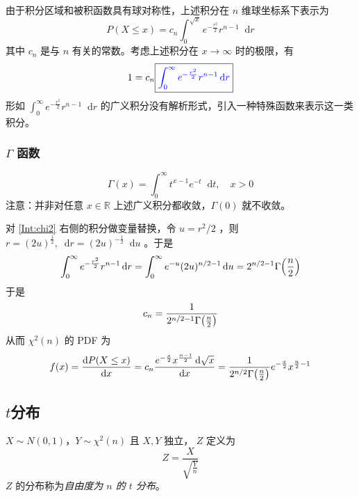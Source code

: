\documentclass[12pt,uft8]{ctexrep}
\newcommand{\dif}{\mathop{}\!\mathrm{d}}
\begin{document}
由于积分区域和被积函数具有球对称性，上述积分在 $n$ 维球坐标系下表示为 
$$ P(X \le x)  = c_n \int_{0}^{\sqrt{x}} e^{-\frac{r^2}{2}}  r^{n-1}\dif r $$
其中 $c_n$ 是与 $n$ 有关的常数。考虑上述积分在 $x\to \infty$ 时的极限，有
\begin{equation}
    1 = c_n \boxed{\color{blue}{\int_{0}^{\infty} e^{-\frac{r^2}{2}}  r^{n-1}\dif r}} \label{Int:chi2}
\end{equation}
形如 $ \int_{0}^{\infty} e^{-\frac{r^2}{2}}  r^{n-1}\dif r $ 的广义积分没有解析形式，引入一种特殊函数来表示这一类积分。

\subsubsection{$\Gamma$ 函数}
$$ \Gamma(x) = \int_0^\infty t^{x-1} e^{-t} \dif t , \quad x > 0 $$
注意：并非对任意 $x\in\mathbb{R}$ 上述广义积分都收敛，$\Gamma(0)$ 就不收敛。

对 \eqref{Int:chi2} 右侧的积分做变量替换，令 $u = r^2/2$ ，则 $r = (2u)^{\frac12}, \dif r = (2u)^{-\frac12}\dif u$ 。于是
$$ \int_{0}^{\infty} e^{-\frac{r^2}{2}}  r^{n-1}\dif r   = \int_{0}^{\infty} e^{-u}  (2u)^{n/2-1} \dif u = 2^{n/2-1} \Gamma\qty(\frac n2)$$
于是 
\[
c_n = \frac1{2^{n/2-1} \Gamma\qty(\frac n2)}
\]
从而 $\chi^2(n)$ 的 PDF 为
$$
    f(x) = \frac{\dif P(X\le x)}{\dif x} = c_n \frac {  e^{-\frac{x}{2}}  x^{\frac{n-1}{2}} \dif\sqrt{x} } {\dif x} = \frac1{2^{n/2} \Gamma\qty(\frac n2)}  e^{-\frac{x}{2}}  x^{\frac{n}{2}-1}
$$

\subsection{$t$分布}
    $X\sim N(0,1)$，$Y\sim \chi^2(n)$ 且 $X,Y$ 独立， $Z$ 定义为
    \[Z = \frac{X}{\sqrt{\frac{Y}{n}}}\]
    $Z$ 的分布称为\emph{自由度为 $n$ 的 $t$ 分布}。
\end{document}
